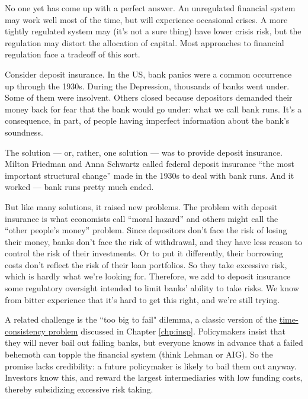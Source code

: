 No one yet has come up with a perfect answer.
An unregulated financial system may work well most of the time,
but will experience occasional crises.
A more tightly regulated system may (it's not a sure thing)
have lower crisis risk, but the regulation may distort
the allocation of capital.
Most approaches to financial regulation face a tradeoff of this sort.

Consider deposit insurance. 
In the US, bank panics were a common occurrence
up through the 1930s.
During the Depression,
thousands of banks went under.
Some of them were insolvent.
Others closed because depositors demanded their money back
for fear that the bank would go under:
what we call bank runs.
It's a consequence, in part, of people having imperfect
information about the bank's soundness.

The solution --- or, rather, one solution --- was to provide deposit insurance.
Milton Friedman 
 and Anna Schwartz called federal
deposit insurance ``the most important structural change''
made in the 1930s to deal with bank runs.
And it worked --- bank runs pretty much ended.

But like many solutions, it raised new problems.
The problem with deposit insurance is what economists call ``moral hazard'' 
and others might call the ``other people's money'' problem.
Since depositors don't face the risk of losing their money,
banks don't face the risk of withdrawal,
and they have less reason to control the risk of their investments.
Or to put it differently, their borrowing costs don't reflect the risk
of their loan portfolios.
So they take excessive risk, which is hardly what we're looking for.
Therefore, we add to deposit insurance some regulatory oversight intended
to limit banks' ability to take risks.
We know from bitter experience that it's hard to get this right,
and we're still trying.

A related challenge is the ``too big to fail" 
dilemma, a classic version
of the \hyperref[sec:time_cons]{time-consistency problem} discussed in Chapter \ref{chp:insp}.
Policymakers insist that they
will never bail out failing banks, but everyone
knows in advance that a failed behemoth can topple the financial system
(think Lehman or AIG).
So the promise lacks credibility: a future policymaker is likely to bail them out anyway.
Investors know this, and reward the largest intermediaries with low funding costs,
thereby subsidizing excessive risk taking.


